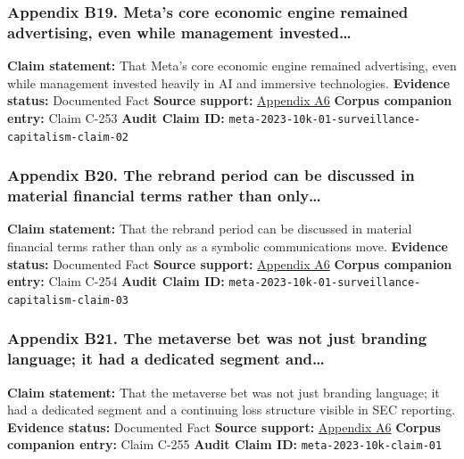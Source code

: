 \documentclass[
  american,
  11pt,
  letterpaper,
]{article}
\begin{document}
\subsubsection{Appendix B19. Meta's core economic engine remained
advertising, even while management
invested\ldots{}}\label{ch-01-appendix-b19-meta-s-core-economic-engine-remained-advertising-even-while-management-invested}

\textbf{Claim statement:} That Meta's core economic engine remained
advertising, even while management invested heavily in AI and immersive
technologies. \textbf{Evidence status:} Documented Fact \textbf{Source
support:}
\hyperref[ch-01-appendix-a6-meta-platforms-inc-2023-annual-report-form-10-k]{Appendix
A6} \textbf{Corpus companion entry:} Claim C-253 \textbf{Audit Claim
ID:} \texttt{meta-2023-10k-01-surveillance-capitalism-claim-02}

\subsubsection{Appendix B20. The rebrand period can be discussed in
material financial terms rather than
only\ldots{}}\label{ch-01-appendix-b20-the-rebrand-period-can-be-discussed-in-material-financial-terms-rather-than-only}

\textbf{Claim statement:} That the rebrand period can be discussed in
material financial terms rather than only as a symbolic communications
move. \textbf{Evidence status:} Documented Fact \textbf{Source support:}
\hyperref[ch-01-appendix-a6-meta-platforms-inc-2023-annual-report-form-10-k]{Appendix
A6} \textbf{Corpus companion entry:} Claim C-254 \textbf{Audit Claim
ID:} \texttt{meta-2023-10k-01-surveillance-capitalism-claim-03}

\subsubsection{Appendix B21. The metaverse bet was not just branding
language; it had a dedicated segment
and\ldots{}}\label{ch-01-appendix-b21-the-metaverse-bet-was-not-just-branding-language-it-had-a-dedicated-segment-and}

\textbf{Claim statement:} That the metaverse bet was not just branding
language; it had a dedicated segment and a continuing loss structure
visible in SEC reporting. \textbf{Evidence status:} Documented Fact
\textbf{Source support:}
\hyperref[ch-01-appendix-a6-meta-platforms-inc-2023-annual-report-form-10-k]{Appendix
A6} \textbf{Corpus companion entry:} Claim C-255 \textbf{Audit Claim
ID:} \texttt{meta-2023-10k-claim-01}
\end{document}
